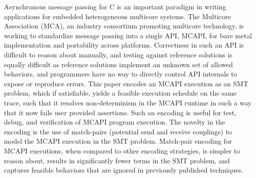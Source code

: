 Asynchronous message passing for C is an important paradigm in writing
applications for embedded heterogeneous multicore systems.  The
Multicore Association (MCA), an industry consortium promoting
multicore technology, is working to standardize message passing into a
single API, MCAPI, for bare metal implementation and portability
across platforms.  Correctness in such an API is difficult to reason
about manually, and testing against reference solutions is equally
difficult as reference solutions implement an unknown set of allowed
behaviors, and programmers have no way to directly control API
internals to expose or reproduce errors.  This paper encodes an MCAPI
execution as an SMT problem, which if satisfiable, yields a feasible
execution schedule on the same trace, 
such that it resolves non-determinism in the MCAPI runtime in such a way that it now fails user provided assertions.
Such an encoding is useful for test, debug, and
verification of MCAPI program execution.  The novelty in the encoding
is the use of match-pairs (potential send and receive couplings) to
model the MCAPI execution in the SMT problem.  Match-pair encoding for
MCAPI executions, when compared to other encoding strategies, is
simpler to reason about, results in significantly fewer terms in the
SMT problem, and captures feasible behaviors that are ignored in
previously published techniques.

